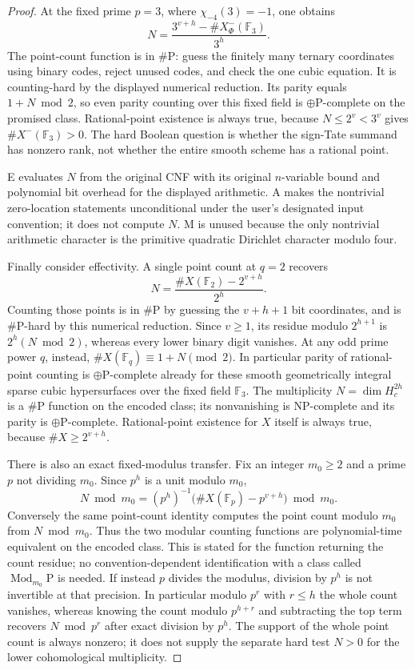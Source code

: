 \begin{proof}
At the fixed prime $p=3$, where $\chi_{-4}(3)=-1$, one obtains
\[
       N=\frac{3^{v+h}-\#X^-_\Phi(\mathbb F_3)}{3^h}.
\]
The point-count function is in $\#\mathrm P$: guess the finitely many ternary coordinates using binary codes, reject unused codes, and check the one cubic equation. It is counting-hard by the displayed numerical reduction. Its parity equals $1+N\bmod2$, so even parity counting over this fixed field is $\oplus\mathrm P$-complete on the promised class. Rational-point existence is always true, because $N\leq2^v<3^v$ gives $\#X^-(\mathbb F_3)>0$. The hard Boolean question is whether the sign-Tate summand has nonzero rank, not whether the entire smooth scheme has a rational point.

E evaluates $N$ from the original CNF with its original $n$-variable bound and polynomial bit overhead for the displayed arithmetic. A makes the nontrivial zero-location statements unconditional under the user's designated input convention; it does not compute $N$. M is unused because the only nontrivial arithmetic character is the primitive quadratic Dirichlet character modulo four.

Finally consider effectivity. A single point count at $q=2$ recovers
\[
          N=\frac{\#X(\mathbb F_2)-2^{v+h}}{2^h}.
\]
Counting those points is in $\#\mathrm P$ by guessing the $v+h+1$ bit coordinates, and is $\#\mathrm P$-hard by this numerical reduction. Since $v\geq1$, its residue modulo $2^{h+1}$ is $2^h(N\bmod2)$, whereas every lower binary digit vanishes. At any odd prime power $q$, instead, $\#X(\mathbb F_q)\equiv1+N\pmod2$. In particular parity of rational-point counting is $\oplus\mathrm P$-complete already for these smooth geometrically integral sparse cubic hypersurfaces over the fixed field $\mathbb F_3$. The multiplicity $N=\dim H_c^{2h}$ is a $\#\mathrm P$ function on the encoded class; its nonvanishing is NP-complete and its parity is $\oplus\mathrm P$-complete. Rational-point existence for $X$ itself is always true, because $\#X\geq2^{v+h}$.

There is also an exact fixed-modulus transfer. Fix an integer $m_0\geq2$ and a prime $p$ not dividing $m_0$. Since $p^h$ is a unit modulo $m_0$,
\[
 N\bmod m_0=(p^h)^{-1}\bigl(\#X(\mathbb F_p)-p^{v+h}\bigr)\bmod m_0.
\]
Conversely the same point-count identity computes the point count modulo $m_0$ from $N\bmod m_0$. Thus the two modular counting functions are polynomial-time equivalent on the encoded class. This is stated for the function returning the count residue; no convention-dependent identification with a class called $\operatorname{Mod}_{m_0}\mathrm P$ is needed. If instead $p$ divides the modulus, division by $p^h$ is not invertible at that precision. In particular modulo $p^r$ with $r\leq h$ the whole count vanishes, whereas knowing the count modulo $p^{h+r}$ and subtracting the top term recovers $N\bmod p^r$ after exact division by $p^h$. The support of the whole point count is always nonzero; it does not supply the separate hard test $N>0$ for the lower cohomological multiplicity.


\end{proof}
